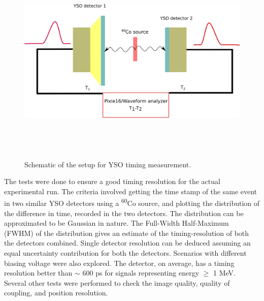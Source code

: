 \begin{figure}[h!]
	\centering
	\includegraphics[width=16cm, height=10cm]{figures/yso_timing_test.png}
	\caption[]{Schematic of the setup for YSO timing measurement. }
	\label{fig:timing_measurement}
\end{figure}


The tests were done to ensure a good timing resolution for the actual experimental run. The criteria involved getting the time stamp of the same event in two similar YSO detectors using a \textsuperscript{60}Co source, and plotting the distribution of the difference in time, recorded in the two detectors. The distribution can be approximated to be Gaussian in nature. The Full-Width Half-Maximum (FWHM) of the distribution gives an estimate of the timing-resolution of both the detectors combined. Single detector resolution can be deduced assuming an equal uncertainty contribution for both the detectors. Scenarios with different biasing voltage were also explored. The detector, on average, has a timing resolution better than $\sim$ 600 ps for signals representing energy $\geq$ 1 MeV. Several other tests were performed to check the image quality, quality of coupling, and position resolution. 

